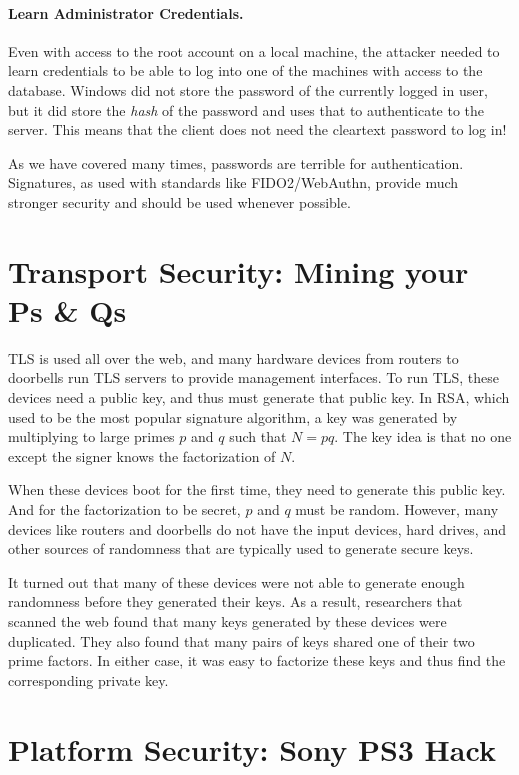 \paragraph{Learn Administrator Credentials.} Even with access to the root account on a local machine, the attacker needed to learn credentials to be able to log into one of the machines with access to the database. Windows did not store the password of the currently logged in user, but it did store the \emph{hash} of the password and uses that to authenticate to the server. This means that the client does not need the cleartext password to log in!

As we have covered many times, passwords are terrible for authentication. Signatures, as used with standards like FIDO2/WebAuthn, provide much stronger security and should be used whenever possible.

\section{Transport Security: Mining your Ps \& Qs}
TLS is used all over the web, and many hardware devices from routers to doorbells run TLS servers to provide management interfaces. To run TLS, these devices need a public key, and thus must generate that public key. In RSA, which used to be the most popular signature algorithm, a key was generated by multiplying to large primes $p$ and $q$ such that $N = pq$. The key idea is that no one except the signer knows the factorization of $N$.

When these devices boot for the first time, they need to generate this public key. And for the factorization to be secret, $p$ and $q$ must be random. However, many devices like routers and doorbells do not have the input devices, hard drives, and other sources of randomness that are typically used to generate secure keys. 

It turned out that many of these devices were not able to generate enough randomness before they generated their keys. As a result, researchers that scanned the web found that many keys generated by these devices were duplicated. They also found that many pairs of keys shared one of their two prime factors. In either case, it was easy to factorize these keys and thus find the corresponding private key.

\section{Platform Security: Sony PS3 Hack}

